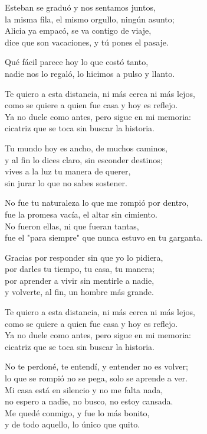 \begin{lyrics}
Esteban se graduó y nos sentamos juntos,\\
la misma fila, el mismo orgullo, ningún asunto;\\
Alicia ya empacó, se va contigo de viaje,\\
dice que son vacaciones, y tú pones el pasaje.

Qué fácil parece hoy lo que costó tanto,\\
nadie nos lo regaló, lo hicimos a pulso y llanto.

Te quiero a esta distancia, ni más cerca ni más lejos,\\
como se quiere a quien fue casa y hoy es reflejo.\\
Ya no duele como antes, pero sigue en mi memoria:\\
cicatriz que se toca sin buscar la historia.

Tu mundo hoy es ancho, de muchos caminos,\\
y al fin lo dices claro, sin esconder destinos;\\
vives a la luz tu manera de querer,\\
sin jurar lo que no sabes sostener.

No fue tu naturaleza lo que me rompió por dentro,\\
fue la promesa vacía, el altar sin cimiento.\\
No fueron ellas, ni que fueran tantas,\\
fue el "para siempre" que nunca estuvo en tu garganta.

Gracias por responder sin que yo lo pidiera,\\
por darles tu tiempo, tu casa, tu manera;\\
por aprender a vivir sin mentirle a nadie,\\
y volverte, al fin, un hombre más grande.

Te quiero a esta distancia, ni más cerca ni más lejos,\\
como se quiere a quien fue casa y hoy es reflejo.\\
Ya no duele como antes, pero sigue en mi memoria:\\
cicatriz que se toca sin buscar la historia.

No te perdoné, te entendí, y entender no es volver;\\
lo que se rompió no se pega, solo se aprende a ver.\\
Mi casa está en silencio y no me falta nada,\\
no espero a nadie, no busco, no estoy cansada.\\
Me quedé conmigo, y fue lo más bonito,\\
y de todo aquello, lo único que quito.


\end{lyrics}

